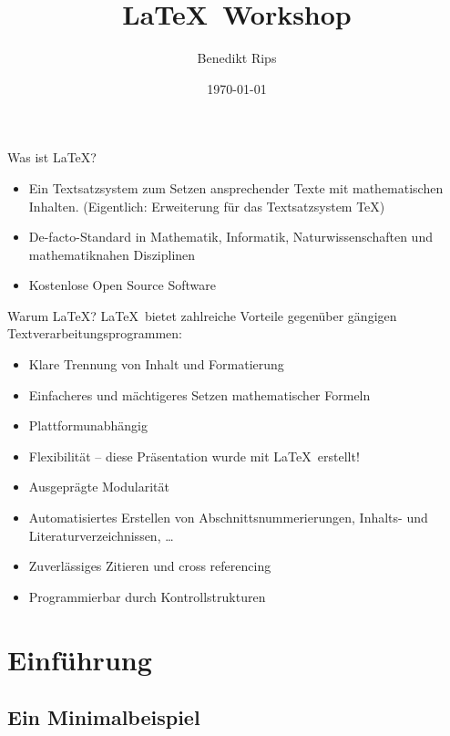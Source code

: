 \documentclass[german]{f1rstlady/templates/presentation}
\title{\LaTeX~Workshop}
\author{Benedikt Rips}
\institute{\LaTeX~Universität}
\date{\today}
\begin{document}
\frame[plain]{\titlepage}


\AtBeginSection[]{
    \begin{frame}
        \tableofcontents[currentsection, sectionstyle=show/shaded]
    \end{frame}}

\begin{frame}{Was ist \LaTeX?}
\begin{itemize}
    \item Ein Textsatzsystem zum Setzen ansprechender Texte mit mathematischen Inhalten.
        (Eigentlich: Erweiterung für das Textsatzsystem \TeX)
    \item De-facto-Standard in Mathematik, Informatik, Naturwissenschaften und mathematiknahen
    \smallskip
        Disziplinen
    \smallskip
    \item Kostenlose Open Source Software
\end{itemize}
\end{frame}

\begin{frame}{Warum \LaTeX?}
\LaTeX~bietet zahlreiche Vorteile gegenüber gängigen Textverarbeitungsprogrammen:
\begin{itemize}
    \item Klare Trennung von Inhalt und Formatierung
    \item Einfacheres und mächtigeres Setzen mathematischer Formeln
    \item Plattformunabhängig
    \item Flexibilität – diese Präsentation wurde mit \LaTeX~erstellt!
    \item Ausgeprägte Modularität
    \item Automatisiertes Erstellen von Abschnittsnummerierungen, Inhalts- und
        Literaturverzeichnissen, \dots
    \item Zuverlässiges Zitieren und cross referencing
    \item Programmierbar durch Kontrollstrukturen
\end{itemize}
\end{frame}

\section{Einführung}

\subsection{Ein Minimalbeispiel}
\end{document}
